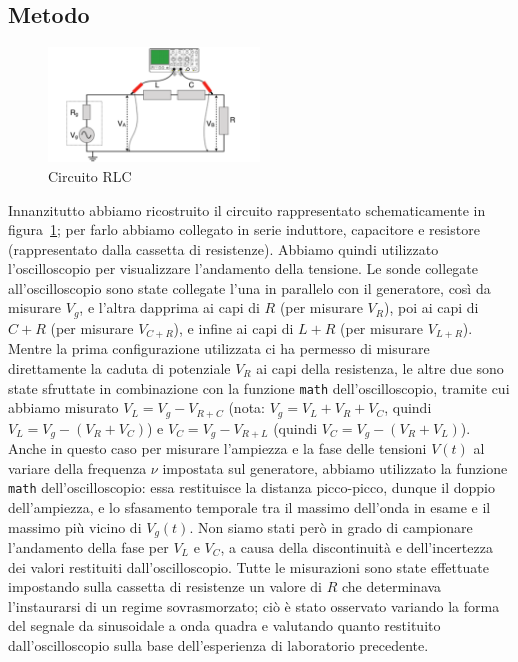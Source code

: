 \documentclass[a4paper]{article}
\begin{document}
\subsection{Metodo}
\begin{figure}[htbp]
	\centering
	\includegraphics[width=0.5\textwidth]{grafici/circuito-rlc.png}
	\caption{Circuito RLC}
	\label{fig:rlc_circuito}
\end{figure}
Innanzitutto abbiamo ricostruito il circuito rappresentato schematicamente in figura~\ref{fig:rlc_circuito}; per farlo abbiamo collegato in serie induttore, capacitore e resistore (rappresentato dalla cassetta di resistenze). Abbiamo quindi utilizzato l'oscilloscopio per visualizzare l'andamento della tensione. Le sonde collegate all'oscilloscopio sono state collegate l'una in parallelo con il generatore, così da misurare $V_g$, e l'altra dapprima ai capi di $R$ (per misurare $V_R$), poi ai capi di $C + R$ (per misurare $V_{C+R}$), e infine ai capi di $L + R$ (per misurare $V_{L+R}$). Mentre la prima configurazione utilizzata ci ha permesso di misurare direttamente la caduta di potenziale $V_R$ ai capi della resistenza, le altre due sono state sfruttate in combinazione con la funzione \texttt{math} dell'oscilloscopio, tramite cui abbiamo misurato $V_L = V_g - V_{R+C}$ (nota: $V_g = V_L + V_R + V_C$, quindi $V_L = V_g - (V_R+V_C)$) e $V_C = V_g - V_{R+L}$ (quindi $V_C = V_g - (V_R+V_L)$).
Anche in questo caso per misurare l'ampiezza e la fase delle tensioni $V(t)$ al variare della frequenza $\nu$ impostata sul generatore, abbiamo utilizzato la funzione \texttt{math} dell'oscilloscopio: essa restituisce la distanza picco-picco, dunque il doppio dell'ampiezza, e lo sfasamento temporale tra il massimo dell'onda in esame e il massimo più vicino di $V_g(t)$. Non siamo stati però in grado di campionare l'andamento della fase per $V_L$ e $V_C$, a causa della discontinuità e dell'incertezza dei valori restituiti dall'oscilloscopio.
Tutte le misurazioni sono state effettuate impostando sulla cassetta di resistenze un valore di $R$ che determinava l'instaurarsi di un regime sovrasmorzato; ciò è stato osservato variando la forma del segnale da sinusoidale a onda quadra e valutando quanto restituito dall'oscilloscopio sulla base dell'esperienza di laboratorio precedente.
\end{document}
